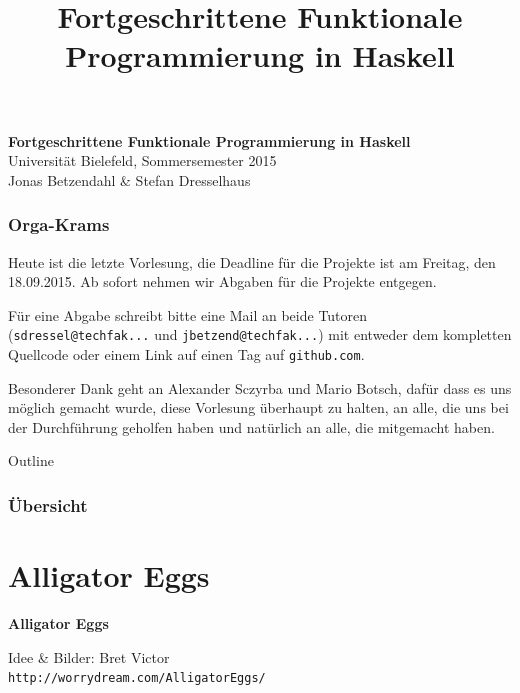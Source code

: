 \documentclass{beamer}
\title{Fortgeschrittene Funktionale Programmierung in Haskell}
\begin{document}
  

  \begin{frame}
  \begin{center}
    \huge\textbf{Fortgeschrittene Funktionale Programmierung in Haskell}\\ \bigskip
    \LARGE Universität Bielefeld, Sommersemester 2015\\ \bigskip
    \large Jonas Betzendahl \& Stefan Dresselhaus
    \end{center}
  \end{frame}
  

\begin{frame}
\frametitle{Orga-Krams}

Heute ist die letzte Vorlesung, die Deadline für die Projekte ist am Freitag, den 18.09.2015. Ab sofort nehmen wir Abgaben für die Projekte entgegen.

Für eine Abgabe schreibt bitte eine Mail an beide Tutoren (\texttt{sdressel@techfak...} und \texttt{jbetzend@techfak...}) mit entweder dem kompletten Quellcode oder einem Link auf einen Tag auf \texttt{github.com}.\pause\bigskip

Besonderer Dank geht an Alexander Sczyrba und Mario Botsch, dafür dass es uns möglich gemacht wurde, diese Vorlesung überhaupt zu halten, an alle, die uns bei der Durchführung geholfen haben und natürlich an alle, die mitgemacht haben. 
\end{frame}


\begin{frame}[allowframebreaks]{Outline}
\frametitle{Übersicht}

\tableofcontents
\end{frame}

\section*{Alligator Eggs}

\begin{frame}

\begin{center}
\Large \textbf{Alligator Eggs} \tiny \bigskip

Idee \& Bilder: Bret Victor\\
\texttt{http://worrydream.com/AlligatorEggs/}
\end{center}

\end{frame}
\end{document}
